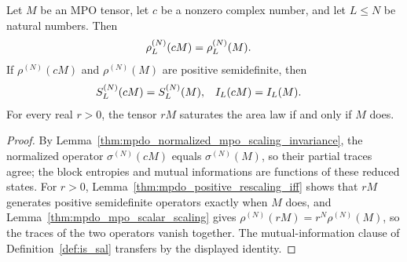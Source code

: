 \begin{lemma}
    \label{lem:mpdo_area_law_scaling_invariance}
    \leanok
    Let $M$ be an MPO tensor, let $c$ be a nonzero complex number, and let
    $L\le N$ be natural numbers. Then
    \begin{align}
        \rho_L^{(N)}(cM) & =\rho_L^{(N)}(M).
        \notag
    \end{align}
    If $\rho^{(N)}(cM)$ and $\rho^{(N)}(M)$ are positive semidefinite, then
    \begin{align}
        S_L^{(N)}(cM) & =S_L^{(N)}(M),
                      & I_L(cM)        & =I_L(M).
        \notag
    \end{align}
    For every real $r>0$, the tensor $rM$ saturates the area law if and only
    if $M$ does.
\end{lemma}
\begin{proof}\leanok
    By Lemma~\ref{thm:mpdo_normalized_mpo_scaling_invariance}, the
    normalized operator $\sigma^{(N)}(cM)$ equals $\sigma^{(N)}(M)$, so their
    partial traces agree; the block entropies and mutual informations are
    functions of these reduced states. For $r>0$,
    Lemma~\ref{thm:mpdo_positive_rescaling_iff} shows that $rM$ generates
    positive semidefinite operators exactly when $M$ does, and
    Lemma~\ref{thm:mpdo_mpo_scalar_scaling} gives
    $\rho^{(N)}(rM)=r^N\rho^{(N)}(M)$, so the traces of the two operators
    vanish together.
    The mutual-information clause of Definition~\ref{def:is_sal} transfers by
    the displayed identity.
\end{proof}

